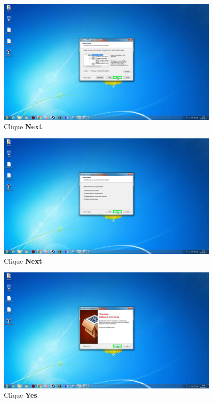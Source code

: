 \documentclass[10pt]{article}
\begin{document}
\begin{figure}[H]
    \centering
    \caption{Clique \textbf{Next}}
    \label{fig:24}
    \includegraphics[width=\linewidth]{images/instalacao_virtualbox/004.png}
\end{figure}

\begin{figure}[H]
    \centering
    \caption{Clique \textbf{Next}}
    \label{fig:25}
    \includegraphics[width=\linewidth]{images/instalacao_virtualbox/005.png}
\end{figure}

\begin{figure}[H]
    \centering
    \caption{Clique \textbf{Yes}}
    \label{fig:26}
    \includegraphics[width=\linewidth]{images/instalacao_virtualbox/006.png}
\end{figure}
\end{document}
